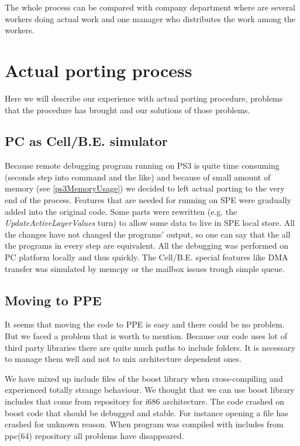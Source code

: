 \par
The whole process can be compared with company department where are several workers doing actual work and one manager who distributes the work among the workers.

\section{Actual porting process}

\par
Here we will describe our experience with actual porting procedure, problems that the procedure has brought and our solutions of those problems.

\subsection{PC as \mbox{Cell/B.E.} simulator}

\par
Because remote debugging program running on PS3 is quite time consuming (seconds step into command and the like) and because of small amount of memory (see \ref{ps3MemoryUsage}) we decided to left actual porting to the very end of the process.
Features that are needed for running on SPE were gradually added into the original code.
Some parts were rewritten (e.g. the \emph{UpdateActiveLayerValues} turn) to allow some data to live in SPE local store.
All the changes have not changed the programs' output, so one can say that the all the programs in every step are equivalent.
All the debugging was performed on PC platform locally and thus quickly.
The \mbox{Cell/B.E.} special features like DMA transfer was simulated by memcpy or the mailbox issues trough simple queue.

\subsection{Moving to PPE}

\par
It seems that moving the code to PPE is easy and there could be no problem.
But we faced a problem that is worth to mention.
Because our code uses lot of third party libraries there are quite much paths to include folders.
It is necessary to manage them well and not to mix architecture dependent ones.

\par
We have mixed up include files of the boost library when cross-compiling and experienced totally strange behaviour.
We thought that we can use boost library includes that come from repository for i686 architecture.
The code crashed on boost code that should be debugged and stable.
For instance opening a file has crashed for unknown reason.
When program was compiled with includes from ppc(64) repository all problems have disappeared.

